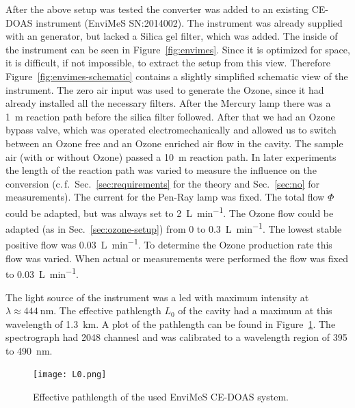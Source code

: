 After the above setup was tested the converter was added to an
existing CE-DOAS instrument (EnviMeS SN:2014002).  The instrument was
already supplied with an  generator, but lacked a Silica gel
filter, which was added. The inside of the instrument can be seen in
Figure~\ref{fig:envimes}. Since it is optimized for space, it is
difficult, if not impossible, to extract the setup from this
view. Therefore Figure~\ref{fig:envimes-schematic} contains a slightly
simplified schematic view of the instrument. The zero air input was
used to generate the Ozone, since it had already installed all the
necessary filters. After the Mercury lamp there was a \SI{1}{\meter}
reaction path before the silica filter followed. After that we had an
Ozone bypass valve, which was operated electromechanically and allowed
us to switch between an Ozone free and an Ozone enriched air flow in
the cavity. The sample air (with or without Ozone) passed a
\SI{10}{\meter} reaction path. In later experiments the length of the
reaction path was varied to measure the influence on the 
conversion (c.\,f.\ Sec.~\ref{sec:requirements} for the theory and
Sec.~\ref{sec:no} for measurements). The current for the Pen-Ray lamp
was fixed. The total flow $\Phi$ could be adapted, but was always set to
\SI{2}{\liter\per\minute}. The Ozone flow could be adapted (as in
Sec.~\ref{sec:ozone-setup}) from 0 to \SI{0.3}{\liter\per\minute}. The
lowest stable positive flow was \SI{0.03}{\liter\per\minute}. To
determine the Ozone production rate this flow was varied. When actual
 or  measurements were performed the flow was fixed to
\SI{0.03}{\liter\per\minute}.

The light source of the instrument was a led with maximum intensity at
$\lambda \approx \SI{444}{\nano\meter}$. The effective pathlength $L_0$ of
the cavity had a maximum at this wavelength of
\SI{1.3}{\kilo\meter}. A plot of the pathlength can be found in
Figure~\ref{fig:pathlength}. The spectrograph had \num{2048} channesl
and was calibrated to a wavelength region of \num{395} to
\SI{490}{\nano\meter}.

\begin{figure}[htbp]
  \centering
  \texttt{[image: L0.png]}
  \caption{Effective pathlength of the used EnviMeS CE-DOAS system.}
  \label{fig:pathlength}
\end{figure}


